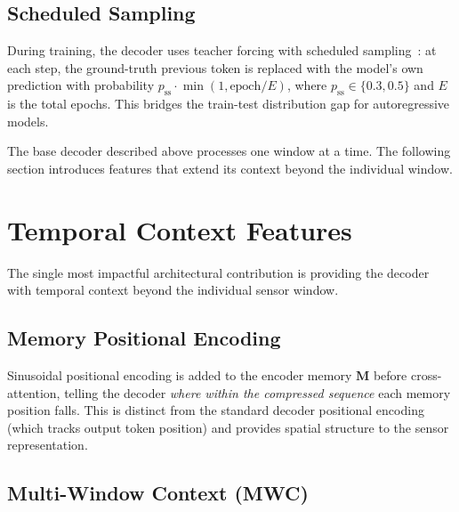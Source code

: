 \documentclass[sensors,article,submit,moreauthors,pdftex]{Definitions/mdpi}
\begin{document}
\subsection{Scheduled Sampling}

During training, the decoder uses teacher forcing with scheduled sampling~\cite{scheduled_sampling}: at each step, the ground-truth previous token is replaced with the model's own prediction with probability $p_\text{ss} \cdot \min(1, \text{epoch}/E)$, where $p_\text{ss} \in \{0.3, 0.5\}$ and $E$ is the total epochs. This bridges the train-test distribution gap for autoregressive models.

The base decoder described above processes one window at a time. The following section introduces features that extend its context beyond the individual window.

\section{Temporal Context Features}
\label{sec:v7_features}

The single most impactful architectural contribution is providing the decoder with temporal context beyond the individual sensor window.

\subsection{Memory Positional Encoding}

Sinusoidal positional encoding is added to the encoder memory $\mathbf{M}$ before cross-attention, telling the decoder \emph{where within the compressed sequence} each memory position falls. This is distinct from the standard decoder positional encoding (which tracks output token position) and provides spatial structure to the sensor representation.

\subsection{Multi-Window Context (MWC)}
\end{document}
